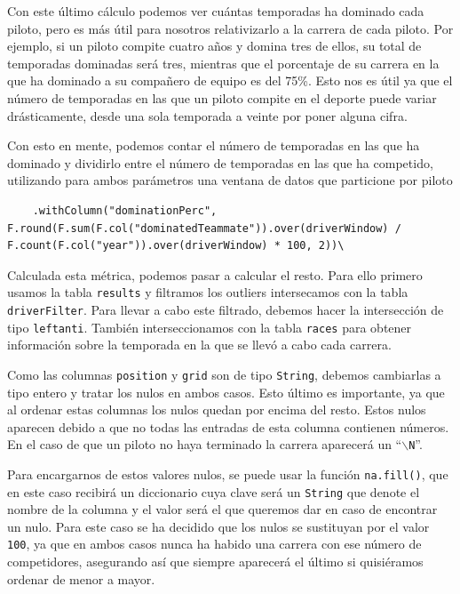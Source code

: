 \documentclass[12pt,twoside,titlepage]{report}
\newcommand{\quotes}[1]{``#1''}
\begin{document}
Con este último cálculo podemos ver cuántas temporadas ha dominado cada piloto, pero es más útil para nosotros relativizarlo a la carrera de cada piloto. Por ejemplo, si un piloto compite cuatro años y domina tres de ellos, su total de temporadas dominadas será tres, mientras que el porcentaje de su carrera en la que ha dominado a su compañero de equipo es del 75\%. Esto nos es útil ya que el número de temporadas en las que un piloto compite en el deporte puede variar drásticamente, desde una sola temporada a veinte por poner alguna cifra.

Con esto en mente, podemos contar el número de temporadas en las que ha dominado y dividirlo entre el número de temporadas en las que ha competido, utilizando para ambos parámetros una ventana de datos que particione por piloto

\begin{lstlisting}
	.withColumn("dominationPerc", F.round(F.sum(F.col("dominatedTeammate")).over(driverWindow) / F.count(F.col("year")).over(driverWindow) * 100, 2))\
\end{lstlisting}

Calculada esta métrica, podemos pasar a calcular el resto. Para ello primero usamos la tabla \texttt{results} y filtramos los outliers intersecamos con la tabla \texttt{driverFilter}. Para llevar a cabo este filtrado, debemos hacer la intersección de tipo \texttt{leftanti}. También interseccionamos con la tabla \texttt{races} para obtener información sobre la temporada en la que se llevó a cabo cada carrera.

Como las columnas \texttt{position} y \texttt{grid} son de tipo \texttt{String}, debemos cambiarlas a tipo entero y tratar los nulos en ambos casos. Esto último es importante, ya que al ordenar estas columnas los nulos quedan por encima del resto. Estos nulos aparecen debido a que no todas las entradas de esta columna contienen números. En el caso de que un piloto no haya terminado la carrera aparecerá un \quotes{\texttt{$\backslash$N}}.

Para encargarnos de estos valores nulos, se puede usar la función \texttt{na.fill()}, que en este caso recibirá un diccionario cuya clave será un \texttt{String} que denote el nombre de la columna y el valor será el que queremos dar en caso de encontrar un nulo. Para este caso se ha decidido que los nulos se sustituyan por el valor \texttt{100}, ya que en ambos casos nunca ha habido una carrera con ese número de competidores, asegurando así que siempre aparecerá el último si quisiéramos ordenar de menor a mayor.
\end{document}
